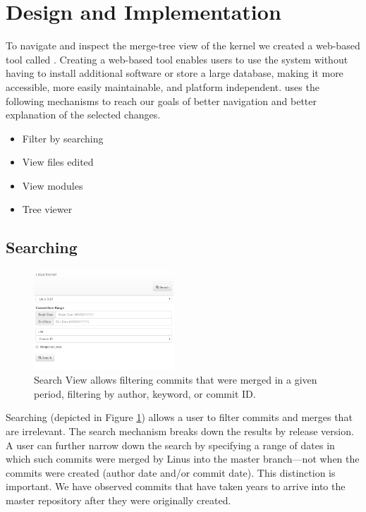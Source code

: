 \documentclass[conference, draftclsnofoot, draft]{IEEEtran}
\begin{document}
\section{Design and Implementation}

To navigate and inspect the merge-tree view of the kernel we created a web-based
tool called \tool. Creating a web-based tool enables users to use the system without
having to install additional software or store a large database, making it more
accessible, more easily maintainable, and platform independent. \tool uses the
following mechanisms to reach our goals of better navigation and better explanation
of the selected changes.

\begin{itemize}
        \item Filter by searching
        \item View files edited
        \item View modules
        \item Tree viewer
\end{itemize}

\subsection{Searching}

\begin{figure}
        \centering
        \includegraphics[width=0.47\textwidth]{figures/search.png}
        \caption{Search View allows filtering commits that were merged in a given
                period, filtering by author, keyword, or commit ID.}
        \label{fig:search}
\end{figure}

Searching (depicted in Figure \ref{fig:search}) allows a user to filter commits and
merges that are irrelevant. The search mechanism breaks down the results by release
version. A user can further narrow down the search by specifying a range of dates in
which such commits were merged by Linus into the master branch---not when the commits
were created (author date and/or commit date). This distinction is important. We have observed commits that have
taken years to arrive into the master repository after they were originally
created.
\end{document}
